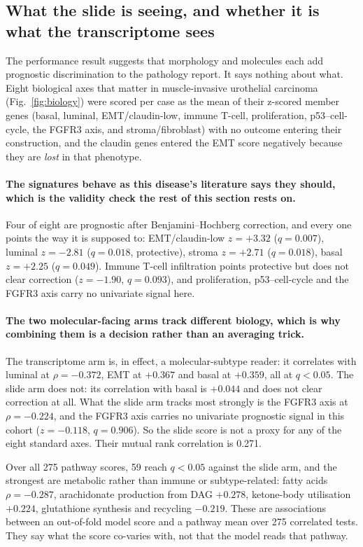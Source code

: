 \documentclass[unnumsec,webpdf,contemporary,large]{oup-authoring-template}
\begin{document}
\subsection{What the slide is seeing, and whether it is what the transcriptome sees}

The performance result suggests that morphology and molecules each add prognostic discrimination
to the pathology report. It says nothing about what. Eight biological axes that matter in
muscle-invasive urothelial carcinoma (Fig.~\ref{fig:biology}) were scored per case as the mean of their z-scored member
genes (basal, luminal, EMT/claudin-low, immune T-cell, proliferation, p53--cell-cycle, the FGFR3 axis, and stroma/fibroblast) with no outcome entering their construction, and the claudin genes
entered the EMT score negatively because they are \emph{lost} in that phenotype.

\paragraph{The signatures behave as this disease's literature says they should, which is the
validity check the rest of this section rests on.} Four of eight are prognostic after
Benjamini--Hochberg correction, and every one points the way it is supposed to: EMT/claudin-low
$z=+3.32$ ($q=0.007$), luminal $z=-2.81$ ($q=0.018$, protective), stroma $z=+2.71$ ($q=0.018$),
basal $z=+2.25$ ($q=0.049$). Immune T-cell infiltration points protective but does not clear
correction ($z=-1.90$, $q=0.093$), and proliferation, p53--cell-cycle and the FGFR3 axis carry no
univariate signal here.

\paragraph{The two molecular-facing arms track different biology, which is why combining them is a
decision rather than an averaging trick.} The transcriptome arm is, in effect, a molecular-subtype
reader: it correlates with luminal at $\rho=-0.372$, EMT at $+0.367$ and basal at $+0.359$, all at
$q<0.05$. The slide arm does not: its correlation with basal is $+0.044$ and does not clear
correction at all. What the slide arm tracks most strongly is the FGFR3 axis at $\rho=-0.224$, and the FGFR3 axis carries no univariate prognostic signal in this cohort ($z=-0.118$,
$q=0.906$). So the slide score is not a proxy for any of the eight standard axes. Their mutual rank
correlation is 0.271.

Over all 275 pathway scores, 59 reach $q<0.05$ against the slide arm, and the strongest are
metabolic rather than immune or subtype-related: fatty acids $\rho=-0.287$, arachidonate production
from DAG $+0.278$, ketone-body utilisation $+0.224$, glutathione synthesis and recycling $-0.219$.
These are associations between an out-of-fold model score and a pathway mean over 275 correlated
tests. They say what the score co-varies with, not that the model reads that pathway.
\end{document}
